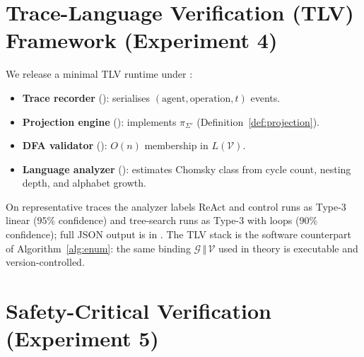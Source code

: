 \begin{table}[ht]
\centering
\caption{Emergent roles from transition-graph clustering (Experiment~3).}
\label{tab:emergence}
\end{table}

\section{Trace-Language Verification (TLV) Framework (Experiment 4)}

We release a minimal TLV runtime under :
\begin{itemize}
\item \textbf{Trace recorder} (): serialises
$(\text{agent}, \text{operation}, t)$ events.
\item \textbf{Projection engine} (): implements
$\pi_{\Sigma'}$ (Definition~\ref{def:projection}).
\item \textbf{DFA validator} (): $O(n)$
membership in $L(\mathcal{V})$.
\item \textbf{Language analyzer} (): estimates
Chomsky class from cycle count, nesting depth, and alphabet growth.
\end{itemize}
On representative traces the analyzer labels ReAct and control runs as
Type-3 linear ($95\%$ confidence) and tree-search runs as Type-3 with
loops ($90\%$ confidence); full JSON output is in
.  The TLV stack is the
software counterpart of Algorithm~\ref{alg:enum}: the same binding
$\mathcal{G}\,\Vert\,\mathcal{V}$ used in theory is executable and
version-controlled.

\section{Safety-Critical Verification (Experiment 5)}

